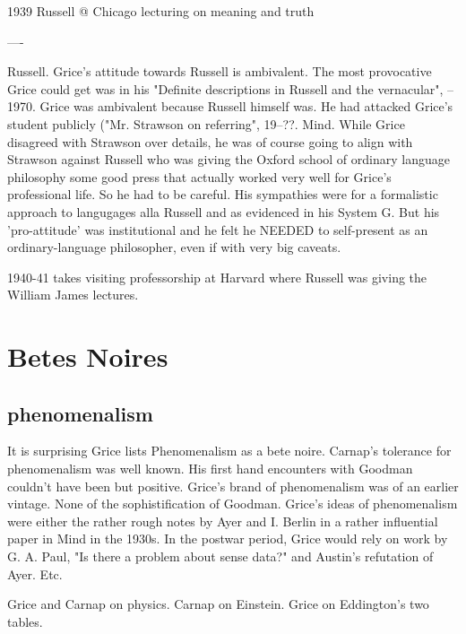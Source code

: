 \documentclass[10pt,titlepage]{book}
\begin{document}
{1939 Russell @ Chicago lecturing on meaning and  truth  

----
 
Russell. Grice's attitude towards Russell is ambivalent. The most  
provocative Grice could get was in his "Definite descriptions in Russell and the  
vernacular", -- 1970. Grice was ambivalent because Russell himself was. He had 
 attacked Grice's student publicly ("Mr. Strawson on referring", 19--??. 
Mind.  While Grice disagreed with Strawson over details, he was of course 
going to  align with Strawson against Russell who was giving the Oxford school 
of ordinary  language philosophy some good press that actually worked very 
well for Grice's  professional life. So he had to be careful. His sympathies 
were for a  formalistic approach to langugages alla Russell and as evidenced 
in his System  G. But his 'pro-attitude' was institutional and he felt he 
NEEDED to  self-present as an ordinary-language philosopher, even if with very 
big  caveats.
 
1940-41 takes visiting professorship at Harvard  where Russell was giving 
the William James lectures.  

\section{Betes Noires}

\subsection{phenomenalism}

It is surprising Grice lists Phenomenalism as a bete noire. Carnap's  
tolerance for phenomenalism was well known. His first hand encounters with  
Goodman couldn't have been but positive. Grice's brand of phenomenalism was of  
an earlier vintage. None of the sophistification of Goodman. Grice's ideas of 
 phenomenalism were either the rather rough notes by Ayer and I. Berlin in 
a  rather influential paper in Mind in the 1930s. In the postwar period, 
Grice  would rely on work by G. A. Paul, "Is there a problem about sense data?" 
and  Austin's refutation of Ayer. Etc.

Grice and Carnap on physics. Carnap on Einstein. Grice on Eddington's two  
tables.
 
}
\end{document}
